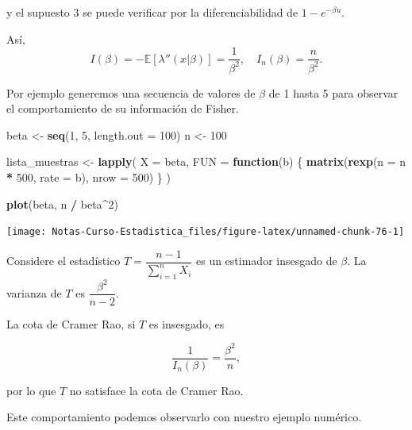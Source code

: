\documentclass[
  12pt,
]{book}
\newenvironment{Shaded}{\begin{snugshade}}{\end{snugshade}}
\newcommand{\ControlFlowTok}[1]{\textcolor[rgb]{0.13,0.29,0.53}{\textbf{#1}}}
\newcommand{\DataTypeTok}[1]{\textcolor[rgb]{0.13,0.29,0.53}{#1}}
\newcommand{\DecValTok}[1]{\textcolor[rgb]{0.00,0.00,0.81}{#1}}
\newcommand{\KeywordTok}[1]{\textcolor[rgb]{0.13,0.29,0.53}{\textbf{#1}}}
\newcommand{\NormalTok}[1]{#1}
\newcommand{\OperatorTok}[1]{\textcolor[rgb]{0.81,0.36,0.00}{\textbf{#1}}}
\newcommand{\StringTok}[1]{\textcolor[rgb]{0.31,0.60,0.02}{#1}}
\begin{document}
y el supuesto 3 se puede verificar por la diferenciabilidad de \(1-e^{-\beta u}\).

Así,
\[I(\beta) = -\mathbb E[\lambda''(x|\beta)] = \dfrac 1{\beta^2}, \quad I_n(\beta) = \dfrac{n}{\beta^2}.\]

Por ejemplo generemos una secuencia de valores de \(\beta\) de 1 hasta 5 para
observar el comportamiento de su información de Fisher.

\begin{Shaded}
\begin{Highlighting}[]
\NormalTok{beta \textless{}{-}}\StringTok{ }\KeywordTok{seq}\NormalTok{(}\DecValTok{1}\NormalTok{, }\DecValTok{5}\NormalTok{, }\DataTypeTok{length.out =} \DecValTok{100}\NormalTok{)}
\NormalTok{n \textless{}{-}}\StringTok{ }\DecValTok{100}

\NormalTok{lista\_muestras \textless{}{-}}\StringTok{ }\KeywordTok{lapply}\NormalTok{(}
  \DataTypeTok{X =}\NormalTok{ beta,}
  \DataTypeTok{FUN =} \ControlFlowTok{function}\NormalTok{(b) \{}
    \KeywordTok{matrix}\NormalTok{(}\KeywordTok{rexp}\NormalTok{(}\DataTypeTok{n =}\NormalTok{ n }\OperatorTok{*}\StringTok{ }\DecValTok{500}\NormalTok{, }\DataTypeTok{rate =}\NormalTok{ b), }\DataTypeTok{nrow =} \DecValTok{500}\NormalTok{)}
\NormalTok{  \}}
\NormalTok{)}

\KeywordTok{plot}\NormalTok{(beta, n }\OperatorTok{/}\StringTok{ }\NormalTok{beta}\OperatorTok{\^{}}\DecValTok{2}\NormalTok{)}
\end{Highlighting}
\end{Shaded}

\begin{center}\texttt{[image: Notas-Curso-Estadistica\_files/figure-latex/unnamed-chunk-76-1]} \end{center}

Considere el estadístico \(T = \dfrac{n-1}{\sum_{i=1}^n X_i}\) es un estimador insesgado de \(\beta\). La varianza de \(T\) es \(\dfrac{\beta^2}{n-2}\).

La cota de Cramer Rao, si \(T\) es insesgado, es

\[\dfrac 1{I_n(\beta)} = \dfrac{\beta^2}{n},\]

por lo que \(T\) no satisface la cota de Cramer Rao.

Este comportamiento podemos observarlo con nuestro ejemplo numérico.
\end{document}
